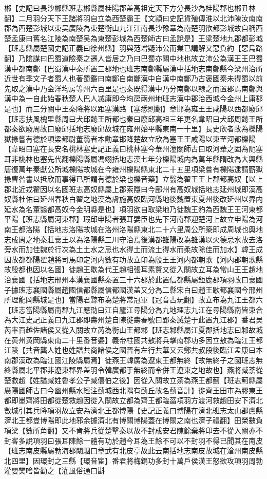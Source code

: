 郴【史記曰長沙郴縣班志郴縣屬桂陽郡盖高祖定天下方分長沙為桂陽郡也郴丑林翻】二月羽分天下王諸將羽自立為西楚霸王【文頴曰史記貨殖傳淮以北沛陳汝南南郡為西楚彭城以東吴廣陵為東楚衡山九江江南長沙豫章為南楚羽欲都彭城故自稱西楚孟康曰舊名江陵為南楚吴為東楚彭城為西楚師古曰孟說是】王梁楚地九郡都彭城【班志縣屬楚國史記正義曰徐州縣】羽與范增疑沛公而業已講解又惡負約【惡烏路翻】乃隂謀曰巴蜀道險秦之遷人皆居之乃曰巴蜀亦關中地也故立沛公為漢王王巴蜀漢中都南鄭【巴蜀漢中秦所置三郡地也班志南鄭縣屬漢中括地志南鄭縣今梁州治所近世有季文子者蜀人也著蜀鑑曰南鄭自南鄭漢中自漢中南鄭乃古褒國秦未得蜀以前先取之漢中乃金洋均房等州六百里是也秦既得漢中乃分南鄭以隸之而置郡焉南鄭與漢中為一自此始春秋楚人巴人㓕庸即今均房兩州地班志漢中郡治西城今金州上庸郡是也】而三分關中王秦降將以距塞漢路【塞悉則翻】章邯為雍王王咸陽以西都廢邱【班志扶風槐里縣周曰犬邱懿王所都也秦曰廢邱高祖三年更名韋昭曰犬邱周懿王所都秦欲廢周故曰廢邱括地志廢邱故城在雍州始平縣東南一十里】長史欣者故為櫟陽獄掾嘗有德於項梁都尉董翳者本勸章邯降楚故立欣為塞王王咸陽以東至河都櫟陽【韋昭曰塞在長安名桃林塞史記正義曰桃林塞今華州潼關師古曰取河華之固為阨塞耳非桃林也塞先代翻櫟陽縣屬馮翊括地志漢七年分櫟陽城内為萬年縣隋改為大興縣唐復萬年秦獻公所城櫟陽故城在今雍州櫟陽縣東北二十五里項梁嘗有櫟陽逮請蘄獄掾曹咎書以抵欣而事得已所謂有德於梁也櫟音藥】立翳為翟王王上郡都高奴【以上郡北近戎翟因以名國班志高奴縣屬上郡索隱曰今鄜州有高奴城括地志延州城即漢高奴縣杜佑曰延州春秋白翟之地漢為膚施高奴臨河縣地後魏置東夏州後改延州以界内延水為名董翳都高奴今金明縣是也】項羽欲自取梁地乃徙魏王豹為西魏王王河東都平陽【班志縣屬河東郡】瑕邱申陽者張耳嬖臣也先下河南郡迎楚河上故立申陽為河南王都洛陽【括地志洛陽故城在洛州洛陽縣東北二十六里周公所築即成周城也輿地志成周之地秦莊襄王以為洛陽縣三川守治焉後漢都雒陽改為雒漢以火德忌水故去洛旁水而加佳魏於行次為土土水之忌也水得土而流土得水而柔故除佳而加水】韓王成因故都都陽翟趙將司馬卬定河内數有功故立卬為殷王王河内都朝歌【河内郡朝歌縣故殷都也因以名國】徙趙王歇為代王趙相張耳素賢又從入關故立耳為常山王王趙地治襄國【括地志邢州本漢襄國縣秦置三十六郡於此置信都縣屬鉅鹿郡項羽改曰襄國子據班志襄國縣屬趙國信都縣屬信都國漢盖又分為二縣宋白曰趙王歇都襄國今邢州所理龍岡縣城是也】當陽君黥布為楚將常冠軍【冠音古玩翻】故立布為九江王都六【班志當陽縣屬南郡九江應劭曰江自廬江尋陽分為九地理志九江在尋陽縣南皆束合為大江史記正義曰九江郡即夀州楚自陳徙夀春號曰郢秦滅楚于此置九江郡】番君吴芮率百越佐諸侯又從入關故立芮為衡山王都邾【班志邾縣屬江夏郡括地志曰邾故城在黄州黄岡縣東南二十里番音婆】義帝柱國共敖將兵擊南郡功多因立敖為臨江王都江陵【共音龔人姓也姓譜共商諸侯之國晉有左行共華又云鄭共叔段後臨江孟康曰本南郡漢改為臨江國江陵縣屬焉】徙燕王韓廣為遼東王都無終【故無終子之國班志無終縣屬北平郡非遼東郡界盖羽令韓廣都于無終而令併王遼東之地故也】燕將臧荼從楚救趙【姓譜臧姓魯孝公子臧僖伯之後】因從入關故立荼為燕王都薊【班志薊縣屬廣陽國師古曰今幽州縣水經注薊城西北隅有薊丘故名薊音計】徙齊王田市為膠東王都即墨齊將田都從楚救趙因從入關故立都為齊王都臨菑項羽方渡河救趙田安下濟北數城引其兵降項羽故立安為濟北王都博陽【史記正義曰博陽在濟北班志太山郡盧縣濟北王都豈博陽即此地邪余據濟北有博關博陽蓋在博關之南也濟子禮翻】田榮數負項梁【數所角翻】又不肯將兵從楚擊秦以故不封成安君陳餘棄將印去不從入關亦不封客多說項羽曰張耳陳餘一體有功於趙今耳為王餘不可以不封羽不得已聞其在南皮【班志南皮縣屬勃海郡闞駰曰章武有北皮亭故此云南括地志南皮故城在滄州南皮縣北四里】因環封之三縣【環音宦】番君將梅鋗功多封十萬戶侯漢王怒欲攻項羽周勃灌嬰樊噲皆勸之【灌風俗通曰斟